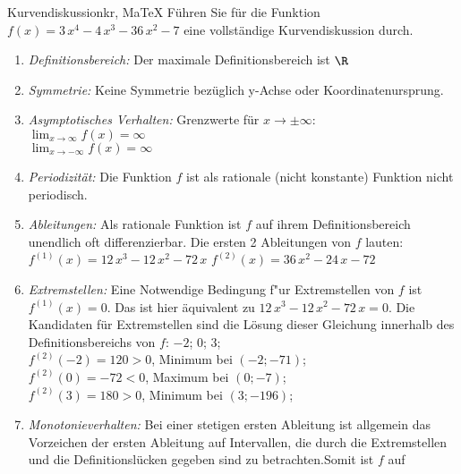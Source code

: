  \providecommand{\MoIl}{(} 
 \providecommand{\MoIr}{)}
 \providecommand{\MIntvlSep}{;} 
 \providecommand{\MElSetSep}{;} 
 \begin{MAufgabe}{Kurvendiskussion}{kr, MaTeX}
 F\"uhren Sie f\"ur die Funktion $f(x)=3\, x^4 - 4\, x^3 - 36\, x^2 - 7$ eine vollst\"andige Kurvendiskussion durch.\\ 
 \ifLsg\Loesung
 \begin{enumerate}
 \item \emph{Definitionsbereich:} 
 Der maximale Definitionsbereich ist $\R$\item \emph{Symmetrie:} 
 Keine Symmetrie bez\"uglich y-Achse oder Koordinatenursprung.\item \emph{Asymptotisches Verhalten:} 
 Grenzwerte f\"ur $x\rightarrow \pm \infty$: \\ 
 $\lim_{x\rightarrow \infty} f(x)=\infty$ \\ 
 $\lim_{x\rightarrow -\infty} f(x)=\infty$ \\ 
 \item \emph{Periodizit\"at:} 
 Die Funktion $f$ ist als rationale (nicht konstante) Funktion nicht periodisch.\item \emph{Ableitungen:} 
 Als rationale Funktion ist $f$ auf ihrem Definitionsbereich unendlich oft differenzierbar. 
 Die ersten 2 Ableitungen von $f$ lauten: \\ 
 $f^{(1)}(x)=12\, x^3 - 12\, x^2 - 72\, x$\newline 
  $f^{(2)}(x)=36\, x^2 - 24\, x - 72$\newline 
  \item \emph{Extremstellen:} 
 Eine Notwendige Bedingung f"ur Extremstellen von $f$ ist $f^{(1)}(x)=0$. 
 Das ist hier \"aquivalent zu $12\, x^3 - 12\, x^2 - 72\, x=0$. 
 Die Kandidaten f\"ur Extremstellen sind die L\"osung dieser Gleichung innerhalb des Definitionsbereichs von $f$: $-2$; $0$; $3$; \\ 
 $f^{(2)}(-2)=120$$>0$, Minimum bei $(-2;-71)$; \\ 
 $f^{(2)}(0)=-72$$<0$, Maximum bei $(0;-7)$; \\ 
 $f^{(2)}(3)=180$$>0$, Minimum bei $(3;-196)$; \\ 
 \item \emph{Monotonieverhalten:} 
 Bei einer stetigen ersten Ableitung ist allgemein das Vorzeichen der ersten Ableitung auf Intervallen, die durch die Extremstellen und die Definitionsl\"ucken gegeben sind zu betrachten.Somit ist $f$ auf \\ 
$$
\end{enumerate}
\end{MAufgabe}
